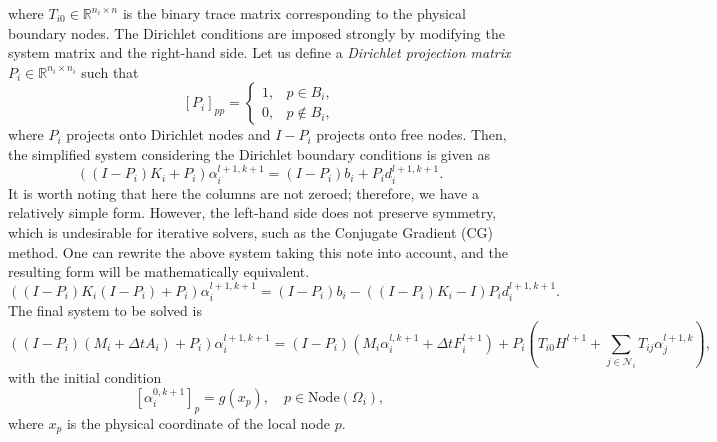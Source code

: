 \documentclass[a4paper, 11pt]{article}
\theoremstyle{plain}
\theoremstyle{definition}
\theoremstyle{remark}
\begin{document}
where $T_{i0}\in \mathbb{R}^{n_{i}\times n}$ is the binary trace matrix corresponding to the physical boundary nodes. The Dirichlet conditions are imposed strongly by modifying the system matrix and the right-hand side. Let us define a \textit{Dirichlet projection matrix} $P_{i}\in \mathbb{R}^{n_{i}\times n_{i}}$ such that
\begin{equation*}
    \left[P_{i}\right]_{pp} = 
    \begin{cases}
        1, & p\in B_{i},\\
        0, & p\notin B_{i},
    \end{cases}
\end{equation*}
where $P_{i}$ projects onto Dirichlet nodes and $I - P_{i}$ projects onto free nodes. Then, the simplified system considering the Dirichlet boundary conditions is given as
\begin{equation*}
    \left(\left(I - P_{i}\right)K_{i} + P_{i}\right)\alpha_{i}^{l+1, k+1} = \left(I - P_{i}\right)b_{i} + P_{i}d^{l+1, k+1}_{i}.
\end{equation*}
It is worth noting that here the columns are not zeroed; therefore, we have a relatively simple form. However, the left-hand side does not preserve symmetry, which is undesirable for iterative solvers, such as the Conjugate Gradient (CG) method. One can rewrite the above system taking this note into account, and the resulting form will be mathematically equivalent.
\begin{equation*}
    \left(\left(I - P_{i}\right)K_{i}\left(I - P_{i}\right) + P_{i}\right)\alpha_{i}^{l+1, k+1} = \left(I - P_{i}\right)b_{i} - \left((I - P_{i})K_{i} - I\right)P_{i}d^{l+1, k+1}_{i}.
\end{equation*}
The final system to be solved is 
\begin{equation*}
    \left(\left(I - P_{i}\right)\left(M_{i} + \Delta t A_{i}\right) + P_{i}\right)\alpha_{i}^{l+1, k+1} = \left(I - P_{i}\right)\left(M_{i} \alpha_{i}^{l, k+1} + \Delta tF_{i}^{l+1}\right) + P_{i}\left(T_{i0}H^{l+1} + \sum_{j\in\mathcal{N}_{i}}T_{ij}\alpha^{l+1, k}_{j}\right),
\end{equation*}
with the initial condition
\begin{equation*}
    \left[\alpha_{i}^{0, k + 1}\right]_{p} = g(x_{p}), \quad p\in \text{Node}(\Omega_{i}),
\end{equation*}
where $x_p$ is the physical coordinate of the local node $p$. \vspace{10pt}
\end{document}
